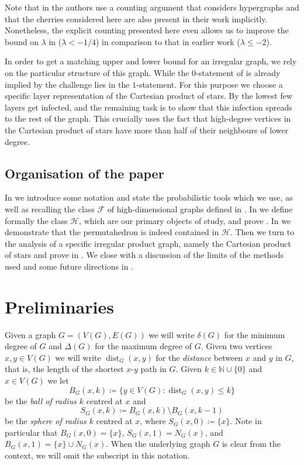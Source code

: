 \documentclass[reqno,a4paper,11pt]{amsart}
\theoremstyle{definition}
\newcommand{\dist}{\operatorname{dist}}
\renewcommand{\leq}{\leqslant}
\begin{document}
Note that in \cite{BaBoMo2009} the authors use a counting argument that considers hypergraphs and that the cherries considered here are also present in their work implicitly.
Nonetheless, the explicit counting presented here even allows us to improve the bound on $\lambda$ in  ($\lambda <-1/4$) in comparison to that in earlier work ($\lambda \leq -2$).

\smallskip

In order to get a matching upper and lower bound for an irregular graph, we rely on the particular structure of this graph.
While the $0$-statement of  is already implied by  the challenge lies in the $1$-statement.
For this purpose we choose a specific layer representation of the Cartesian product of stars.
By  the lowest few layers get infected, and the remaining task is to show that this infection spreads to the rest of the graph.
This crucially uses the fact that high-degree vertices in the Cartesian product of stars have more than half of their neighbours of lower degree.

\subsection{Organisation of the paper}

In  we introduce some notation and state the probabilistic tools which we use, as well as recalling the class $\mathcal{F}$ of high-dimensional graphs defined in \cite{CEGK24}.
In  we define formally the class $\mathcal{H}$, which are our primary objects of study, and prove .
In  we demonstrate that the permutahedron is indeed contained in $\mathcal{H}$.
Then we turn to the analysis of a specific irregular product graph, namely the Cartesian product of stars and prove  in .
We close with a discussion of the limits of the methods used and some future directions in .

\section{Preliminaries}\label{s:preliminary}

Given a graph $G=(V(G), E(G))$ we will write $\delta(G)$ for the minimum degree of $G$ and $\Delta(G)$ for the maximum degree of $G$.
Given two vertices $x,y \in V(G)$ we will write $\dist_{G}(x,y)$ for the \emph{distance} between $x$ and $y$ in $G$, that is, the length of the shortest $x$-$y$ path in $G$.
Given $k \in \mathbb{N} \cup \{0\}$ and $x \in V(G)$ we let
\[
  B_G(x,k)\coloneqq \{ y \in V(G) \colon \dist_G(x,y) \leq k \}
\]
be the \emph{ball of radius $k$} centred at $x$ and
\[
  S_G(x,k) \coloneqq B_G(x,k) \setminus B_G(x,k-1)
\]
be the \emph{sphere of radius $k$} centred at $x$, where $S_G(x, 0) \coloneqq \{x\}$.
Note in particular that $B_G(x, 0) = \{x\}$, $S_G(x, 1) = N_G(x)$, and $B_G(x, 1) = \{x\} \cup N_G(x)$.
When the underlying graph $G$ is clear from the context, we will omit the subscript in this notation.
\end{document}
